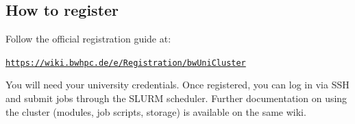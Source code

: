 \documentclass[11pt,a4paper]{article}
\begin{document}
\subsection*{How to register}

Follow the official registration guide at:

\begin{center}
    \href{https://wiki.bwhpc.de/e/Registration/bwUniCluster}{\texttt{https://wiki.bwhpc.de/e/Registration/bwUniCluster}}
\end{center}

You will need your university credentials. Once registered, you can log in via SSH and submit jobs through the SLURM scheduler. Further documentation on using the cluster (modules, job scripts, storage) is available on the same wiki.
\end{document}
